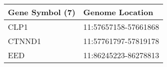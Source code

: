 \begin{tabular}{ll}
\toprule
Gene Symbol (7) &      Genome Location \\
\midrule
           CLP1 & 11:57657158-57661868 \\
         CTNND1 & 11:57761797-57819178 \\
            EED & 11:86245223-86278813 \\
\bottomrule
\end{tabular}
